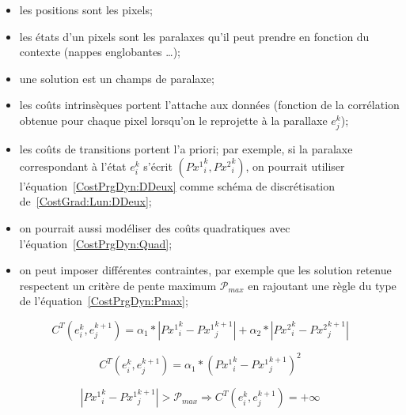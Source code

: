 \begin{itemize}
    \item les positions sont les pixels;

    \item les \'etats d'un pixels sont les paralaxes qu'il peut prendre 
          en fonction du contexte (nappes englobantes \dots);

    \item une solution est un champs de paralaxe;

    \item les co\^uts intrins\`eques portent  l'attache
          aux donn\'ees (fonction de la corr\'elation obtenue pour chaque pixel
	  lorsqu'on le reprojette \`a la parallaxe $e^k_j$);

    \item les co\^uts  de transitions  portent  l'a priori;
          par exemple, si la paralaxe correspondant \`a 
	  l'\'etat $e^k_i$  s'\'ecrit $({Px^1}^k_i,{Px^2}^k_i)$, on pourrait
	  utiliser l'\'equation~\ref{CostPrgDyn:DDeux} comme sch\'ema de
	  discr\'etisation de~\ref{CostGrad:Lun:DDeux}; 
	  
    \item on pourrait  aussi  mod\'eliser des co\^uts quadratiques avec
          l'\'equation~\ref{CostPrgDyn:Quad};
 
    \item on peut imposer diff\'erentes contraintes, par exemple
           que les solution retenue respectent un crit\`ere
          de pente maximum $ \mathcal P_{max}$  en rajoutant une r\`egle du type 
	  de l'\'equation~\ref{CostPrgDyn:Pmax};


\end{itemize}


\begin{equation}
\label{CostPrgDyn:DDeux}
C^T(e^k_i,e^{k+1}_j) =    \alpha_1* |{Px^1}^k_i-{Px^1}^{k+1}_j|
                          + \alpha_2* |{Px^2}^k_i-{Px^2}^{k+1}_j|
\end{equation}

\begin{equation}
\label{CostPrgDyn:Quad}
C^T(e^k_i,e^{k+1}_j) =    \alpha_1* ({Px^1}^k_i-{Px^1}^{k+1}_j)^2
\end{equation}

\begin{equation}
\label{CostPrgDyn:Pmax}
   |{Px^1}^k_i-{Px^1}^{k+1}_j| > \mathcal P_{max} \Rightarrow  C^T(e^k_i,e^{k+1}_j) = + \infty
\end{equation}


